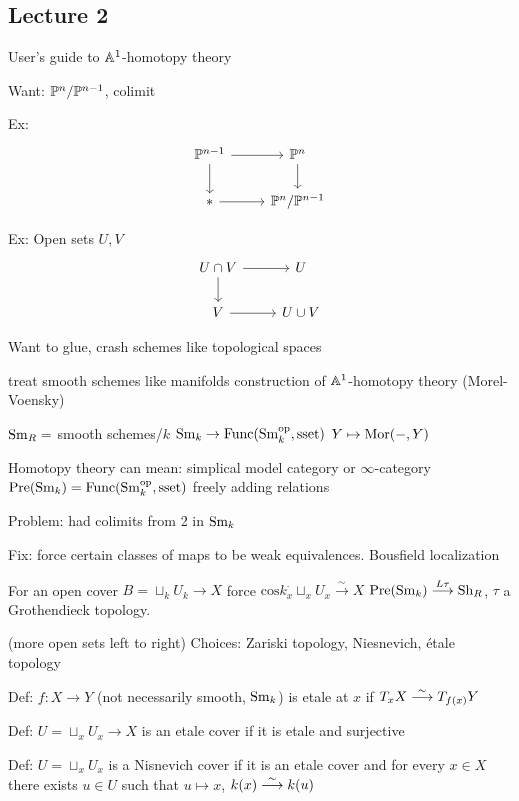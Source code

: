\newpage
\subsection{Lecture 2}

User's guide to $\A^1$-homotopy theory

Want: $\P^n/\P^{n-1}$, colimit

Ex:
	\[
	\begin{tikzcd}
	\P^{n-1} \arrow{r} \arrow{d} & \P^n \arrow{d} \\
	* \arrow{r} & \P^n/\P^{n-1}
	\end{tikzcd}
	\]

Ex: Open sets $U,V$
	\[
	\begin{tikzcd}
	U \cap V \arrow{r} \arrow{d} & U \\
	V \arrow{r} & U \cup V
	\end{tikzcd}
	\]

Want to glue, crash schemes like topological spaces

treat smooth schemes like manifolds
construction of $\A^1$-homotopy theory (Morel-Voensky)

$\sm_R=$ smooth schemes/$k$
$\sm_k \to \func(\sm_k^\text{op}, \text{sset})$
$Y \mapsto \mor(-,Y)$


Homotopy theory can mean: simplical model category or $\infty$-category
$\pre(\sm_k)= \func(\sm_k^\text{op}, \text{sset})$ freely adding relations

Problem: had colimits from 2 in $\sm_k$

Fix: force certain classes of maps to be weak equivalences. Bousfield localization

For an open cover $B= \sqcup_k U_k \to X$
force $\text{cos}k_x^\cdot \sqcup_x U_x \stackrel{\sim}{\to} X$
$\pre(\sm_k) \ma{L\tau} \sh_R$, $\tau$ a Grothendieck topology. 


(more open sets left to right)
Choices: Zariski topology, Niesnevich, \'etale topology



Def: $f: X \to Y$ (not necessarily smooth, $\sm_k$)
is etale at $x$ if $T_x X \ma{\sim} T_{f(x)} Y$


Def: $U= \sqcup_x U_x \to X$ is an etale cover if it is etale and surjective

Def: $U= \sqcup_x U_x$ is a Nisnevich cover if it is an etale cover and for every $x \in X$ there exists $u \in U$ such that $u \mapsto x$, $k(x) \ma{\sim} k(u)$


